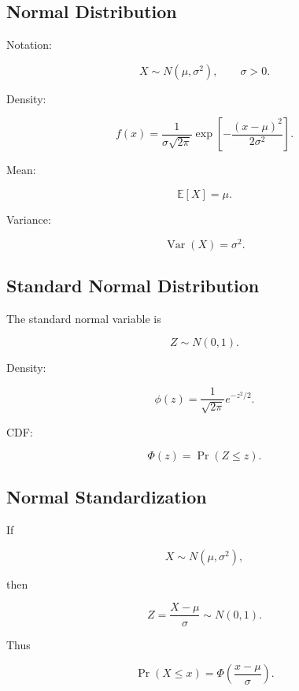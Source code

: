 \subsection{Normal Distribution}
\label{subsec:normal-distribution-reference}

Notation:

\[
\boxed{
X\sim N(\mu,\sigma^2),
\qquad
\sigma>0.
}
\]

Density:

\[
\boxed{
f(x)
=
\frac{
1
}{
\sigma\sqrt{2\pi}
}
\exp
\left[
-\frac{
(x-\mu)^2
}{
2\sigma^2
}
\right].
}
\]

Mean:

\[
\boxed{
\mathbb{E}[X]=\mu.
}
\]

Variance:

\[
\boxed{
\operatorname{Var}(X)=\sigma^2.
}
\]

\subsection{Standard Normal Distribution}
\label{subsec:standard-normal-reference}

The standard normal variable is

\[
\boxed{
Z\sim N(0,1).
}
\]

Density:

\[
\boxed{
\phi(z)
=
\frac{
1
}{
\sqrt{2\pi}
}
e^{-z^2/2}.
}
\]

CDF:

\[
\boxed{
\Phi(z)
=
\Pr(Z\leq z).
}
\]

\subsection{Normal Standardization}
\label{subsec:normal-standardization-reference}

If

\[
X\sim N(\mu,\sigma^2),
\]

then

\[
\boxed{
Z
=
\frac{
X-\mu
}{
\sigma
}
\sim N(0,1).
}
\]

Thus

\[
\boxed{
\Pr(X\leq x)
=
\Phi
\left(
\frac{
x-\mu
}{
\sigma
}
\right).
}
\]

